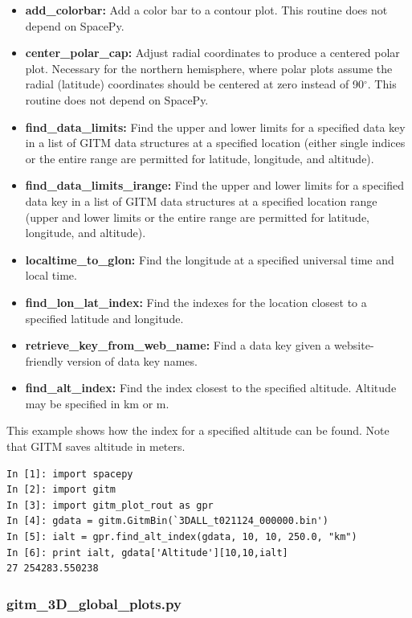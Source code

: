 \begin{itemize}
\item[]{{\bf add\_colorbar:}  Add a color bar to a contour plot.  This routine does not depend on SpacePy.}
\item[]{{\bf center\_polar\_cap:}  Adjust radial coordinates to produce a centered polar plot.  Necessary for the northern hemisphere, where polar plots assume the radial (latitude) coordinates should be centered at zero instead of 90$^\circ$.  This routine does not depend on SpacePy.}
\item[]{{\bf find\_data\_limits:}  Find the upper and lower limits for a specified data key in a list of GITM data structures at a specified location (either single indices or the entire range are permitted for latitude, longitude, and altitude).}
\item[]{{\bf find\_data\_limits\_irange:}  Find the upper and lower limits for a specified data key in a list of GITM data structures at a specified location range (upper and lower limits or the entire range are permitted for latitude, longitude, and altitude).}
\item[]{{\bf localtime\_to\_glon:}  Find the longitude at a specified universal time and local time.}
\item[]{{\bf find\_lon\_lat\_index:}  Find the indexes for the location closest to a specified latitude and longitude.}
\item[]{{\bf retrieve\_key\_from\_web\_name:}  Find a data key given a website-friendly version of data key names.}
\item[]{{\bf find\_alt\_index:} Find the index closest to the specified altitude.  Altitude may be specified in km or m.}
\end{itemize}

This example shows how the index for a specified altitude can be found.  Note that GITM saves altitude in meters.

\begin{verbatim}
In [1]: import spacepy
In [2]: import gitm
In [3]: import gitm_plot_rout as gpr
In [4]: gdata = gitm.GitmBin(`3DALL_t021124_000000.bin')
In [5]: ialt = gpr.find_alt_index(gdata, 10, 10, 250.0, "km")
In [6]: print ialt, gdata['Altitude'][10,10,ialt]
27 254283.550238
\end{verbatim}

\subsubsection{gitm\_3D\_global\_plots.py}

